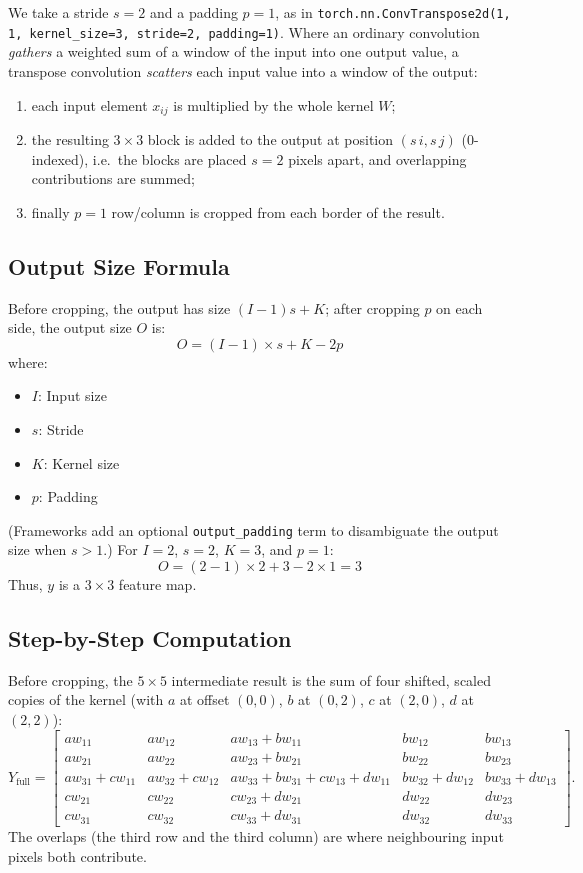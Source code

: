 \begin{notechapter}
We take a stride \( s = 2 \) and a padding \( p = 1 \), as in
\texttt{torch.nn.ConvTranspose2d(1, 1, kernel\_size=3, stride=2, padding=1)}.
Where an ordinary convolution \emph{gathers} a weighted sum of a window of the
input into one output value, a transpose convolution \emph{scatters} each input
value into a window of the output:
\begin{enumerate}
    \item each input element \( x_{ij} \) is multiplied by the whole kernel \( W \);
    \item the resulting \( 3 \times 3 \) block is added to the output at position
          \( (s\,i, s\,j) \) (0-indexed), i.e.\ the blocks are placed \( s = 2 \) pixels apart,
          and overlapping contributions are summed;
    \item finally \( p = 1 \) row/column is cropped from each border of the result.
\end{enumerate}

\subsection{Output Size Formula}
Before cropping, the output has size \( (I - 1)s + K \); after cropping \( p \) on
each side, the output size \( O \) is:
\[
O = (I - 1) \times s + K - 2p
\]
where:
\begin{itemize}
    \item \( I \): Input size
    \item \( s \): Stride
    \item \( K \): Kernel size
    \item \( p \): Padding
\end{itemize}
(Frameworks add an optional \texttt{output\_padding} term to disambiguate the output size when
\( s > 1 \).) For \( I = 2 \), \( s = 2 \), \( K = 3 \), and \( p = 1 \):
\[
O = (2 - 1) \times 2 + 3 - 2 \times 1 = 3
\]
Thus, \( y \) is a \( 3 \times 3 \) feature map.

\subsection{Step-by-Step Computation}
Before cropping, the \( 5 \times 5 \) intermediate result is the sum of four shifted, scaled copies of
the kernel (with \( a \) at offset \( (0,0) \), \( b \) at \( (0,2) \), \( c \) at \( (2,0) \), \( d \) at \( (2,2) \)):
\[
Y_{\text{full}} =
\begin{bmatrix}
a w_{11} & a w_{12} & a w_{13} + b w_{11} & b w_{12} & b w_{13} \\
a w_{21} & a w_{22} & a w_{23} + b w_{21} & b w_{22} & b w_{23} \\
a w_{31} + c w_{11} & a w_{32} + c w_{12} & a w_{33} + b w_{31} + c w_{13} + d w_{11} & b w_{32} + d w_{12} & b w_{33} + d w_{13} \\
c w_{21} & c w_{22} & c w_{23} + d w_{21} & d w_{22} & d w_{23} \\
c w_{31} & c w_{32} & c w_{33} + d w_{31} & d w_{32} & d w_{33}
\end{bmatrix}.
\]
The overlaps (the third row and the third column) are where neighbouring input pixels both contribute.


\end{notechapter}

